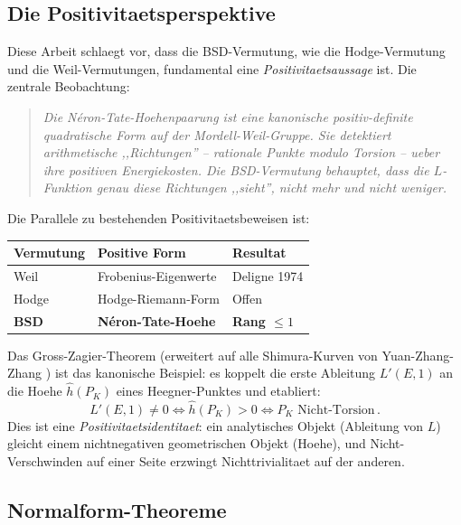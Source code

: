 \documentclass[aps,prd,twocolumn,superscriptaddress,nofootinbib]{revtex4-2}
\theoremstyle{definition}
\theoremstyle{remark}
\begin{document}
\subsection{Die Positivitaetsperspektive}

Diese Arbeit schlaegt vor, dass die BSD-Vermutung, wie die Hodge-Vermutung und die Weil-Vermutungen, fundamental eine \textit{Positivitaetsaussage} ist. Die zentrale Beobachtung:

\begin{quote}
\textit{Die N\'eron-Tate-Hoehenpaarung ist eine kanonische positiv-definite quadratische Form auf der Mordell-Weil-Gruppe. Sie detektiert arithmetische ,,Richtungen'' -- rationale Punkte modulo Torsion -- ueber ihre positiven Energiekosten. Die BSD-Vermutung behauptet, dass die $L$-Funktion genau diese Richtungen ,,sieht'', nicht mehr und nicht weniger.}
\end{quote}

Die Parallele zu bestehenden Positivitaetsbeweisen ist:

\begin{center}
\begin{tabular}{lll}
\toprule
Vermutung & Positive Form & Resultat \\
\midrule
Weil & Frobenius-Eigenwerte & Deligne 1974 \\
Hodge & Hodge-Riemann-Form & Offen \\
\textbf{BSD} & \textbf{N\'eron-Tate-Hoehe} & \textbf{Rang $\leq 1$} \\
\bottomrule
\end{tabular}
\end{center}

Das Gross-Zagier-Theorem \cite{GrossZagier1986} (erweitert auf alle Shimura-Kurven von Yuan-Zhang-Zhang \cite{YZZ2013}) ist das kanonische Beispiel: es koppelt die erste Ableitung $L'(E,1)$ an die Hoehe $\hat{h}(P_K)$ eines Heegner-Punktes und etabliert:
\begin{equation}
L'(E,1) \neq 0 \iff \hat{h}(P_K) > 0 \iff P_K \text{ Nicht-Torsion}\,.
\end{equation}
Dies ist eine \textit{Positivitaetsidentitaet}: ein analytisches Objekt (Ableitung von $L$) gleicht einem nichtnegativen geometrischen Objekt (Hoehe), und Nicht-Verschwinden auf einer Seite erzwingt Nichttrivialitaet auf der anderen.

\subsection{Normalform-Theoreme}
\end{document}
